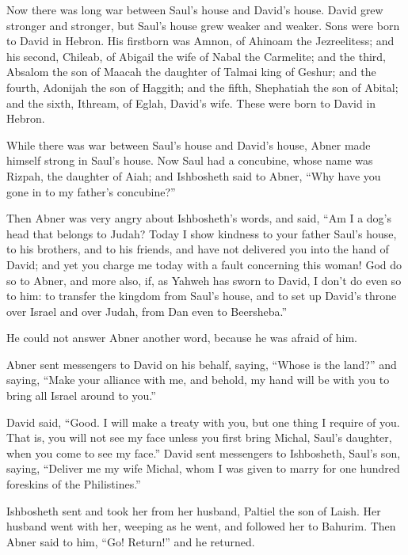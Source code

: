  Now there was long war between Saul's house and David's
house. David grew stronger and stronger, but Saul's house grew weaker
and weaker.  Sons were born to David in Hebron. His
firstborn was Amnon, of Ahinoam the Jezreelitess;  and his
second, Chileab, of Abigail the wife of Nabal the Carmelite; and the
third, Absalom the son of Maacah the daughter of Talmai king of Geshur;
 and the fourth, Adonijah the son of Haggith; and the fifth,
Shephatiah the son of Abital;  and the sixth, Ithream, of
Eglah, David's wife. These were born to David in Hebron.

 While there was war between Saul's house and David's house,
Abner made himself strong in Saul's house.  Now Saul had a
concubine, whose name was Rizpah, the daughter of Aiah; and Ishbosheth
said to Abner, ``Why have you gone in to my father's concubine?''

 Then Abner was very angry about Ishbosheth's words, and
said, ``Am I a dog's head that belongs to Judah? Today I show kindness
to your father Saul's house, to his brothers, and to his friends, and
have not delivered you into the hand of David; and yet you charge me
today with a fault concerning this woman!  God do so to
Abner, and more also, if, as Yahweh has sworn to David, I don't do even
so to him:  to transfer the kingdom from Saul's house, and
to set up David's throne over Israel and over Judah, from Dan even to
Beersheba.''

 He could not answer Abner another word, because he was
afraid of him.

 Abner sent messengers to David on his behalf, saying,
``Whose is the land?'' and saying, ``Make your alliance with me, and
behold, my hand will be with you to bring all Israel around to you.''

 David said, ``Good. I will make a treaty with you, but one
thing I require of you. That is, you will not see my face unless you
first bring Michal, Saul's daughter, when you come to see my face.''
 David sent messengers to Ishbosheth, Saul's son, saying,
``Deliver me my wife Michal, whom I was given to marry for one hundred
foreskins of the Philistines.''

 Ishbosheth sent and took her from her husband, Paltiel the
son of Laish.  Her husband went with her, weeping as he
went, and followed her to Bahurim. Then Abner said to him, ``Go!
Return!'' and he returned.

